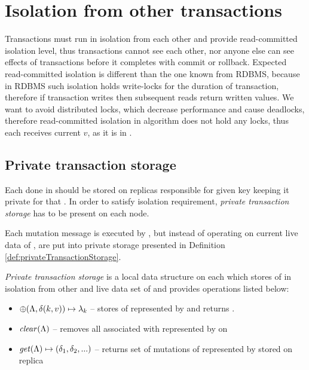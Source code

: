 
\section{Isolation from other transactions}
Transactions must run in isolation from each other and provide read-committed isolation level, thus transactions cannot see each other, nor anyone else can see effects of transactions before it completes with commit or rollback. Expected read-committed isolation is different than the one known from RDBMS, because in RDBMS such isolation holds write-locks for the duration of transaction, therefore if transaction writes then subsequent reads return written values. We want to avoid distributed locks, which decrease performance and cause deadlocks, therefore read-committed isolation in \mpt algorithm does not hold any locks, thus each \selectMessage receives current $v$, as it is in \database.

\subsection{Private transaction storage}
\label{sec:mpp:privateTxStorage}
Each  done in \transaction should be stored on replicas responsible for given key keeping it private for that \transaction. In order to satisfy isolation requirement, \emph{private transaction storage} has to be present on each node.

Each mutation message is executed by , but instead of operating on current live data of \database, \mutations are put into private storage presented in Definition \ref{def:privateTransactionStorage}. 

\begin{definition}
\label{def:privateTransactionStorage}
\emph{Private transaction storage} is a local data structure on each  which stores \mutations of \transaction in isolation from other \transactions and live data set of \database and provides operations listed below: 
  \begin{itemize}
    \item $\oplus(\text{$\Lambda$}, \text{$\delta(k, v)$}) \mapsto \text{$\lambda_{k}$}$ -- stores  of \transactionj represented by \txState and returns . 
    \item $\mathit{clear}(\text{$\Lambda$})$ -- removes all \mutations associated with \transactionj represented by \txState on 
    \item $\mathit{get}(\text{$\Lambda$}) \mapsto \text{$(\delta_{1}, \delta_{2}, ...)$}$ -- returns set of mutations of  \transactionj represented by \txState stored on replica  
  \end{itemize}
\end{definition}

